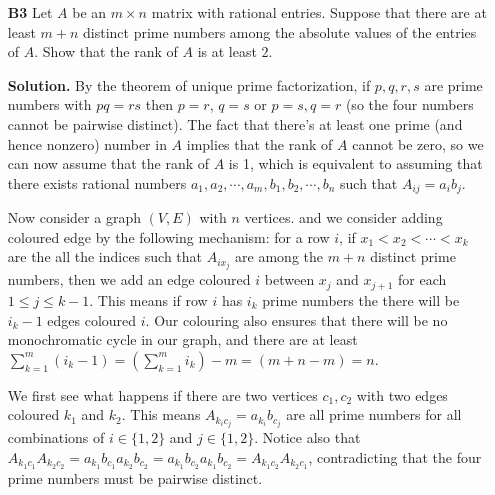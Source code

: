 \documentclass[11pt,a4paper]{article}
\newcommand{\<}{\langle}
\renewcommand{\>}{\rangle}
\begin{document}
\begin{enumerate}
	\item[\textbf{B3}] Let $A$ be an $m\times n$ matrix with rational entries. Suppose that there are at least $m+n$ distinct prime numbers among the absolute values of the entries of $A.$ Show that the rank of $A$ is at least $2.$
	
	\textbf{Solution.} 
	By the theorem of unique prime factorization, if $p, q, r, s$ are prime numbers with $pq=rs$ then $p=r$, $q=s$ or $p=s, q=r$ (so the four numbers cannot be pairwise distinct). 
	The fact that there's at least one prime (and hence nonzero) number in $A$ implies that the rank of $A$ cannot be zero, so we can now assume that the rank of $A$ is 1, which is equivalent to assuming that there exists rational numbers $a_1, a_2, \cdots , a_m, b_1, b_2, \cdots , b_n$ such that $A_{ij}=a_ib_j$. 
	
	Now consider a graph $(V, E)$ with $n$ vertices. and we consider adding coloured edge by the following mechanism: for a row $i$, if $x_1<x_2<\cdots < x_k$ are the all the indices such that $A_{ix_j}$ are among the $m+n$ distinct prime numbers, then we add an edge coloured $i$ between $x_j$ and $x_{j+1}$ for each $1\le j\le k-1$. This means if row $i$ has $i_k$ prime numbers the there will be $i_k-1$ edges coloured $i$. Our colouring also ensures that there will be no monochromatic cycle in our graph, and there are at least $\displaystyle\sum_{k=1}^m (i_k-1)=(\displaystyle\sum_{k=1}^m i_k)-m=(m+n-m)=n$. 
	
	We first see what happens if there are two vertices $c_1, c_2$ with two edges coloured $k_1$ and $k_2$. This means $A_{k_ic_j}=a_{k_i}b_{c_j}$ are all prime numbers for all combinations of $i\in \{1, 2\}$ and $j\in \{1, 2\}$. Notice also that $A_{k_1c_1}A_{k_2c_2}=a_{k_1}b_{c_1}a_{k_2}b_{c_2}=a_{k_1}b_{c_2}a_{k_1}b_{c_2}=A_{k_1c_2}A_{k_2c_1}$, contradicting that the four prime numbers must be pairwise distinct. 
	

\end{enumerate}
\end{document}
